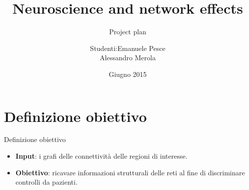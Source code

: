 \documentclass[10pt, compress]{beamer}
\begin{document}
	\title{Neuroscience and network effects}
	\subtitle{Project plan}
	\date{ \vspace{1cm} \hspace{0.1cm}  Giugno 2015}

	\author{\begin{tabular}{l@{ }l} 
			Studenti:      & Emanuele Pesce\\
			& Alessandro Merola \\[1ex]
		\end{tabular}}
		
		\begin{frame}
			\titlepage
		\end{frame}
		
%		
		
		\section{Definizione obiettivo}
			\begin{frame}{Definizione obiettivo}
				\begin{itemize}
					\item \textbf{Input}: i grafi delle connettività delle regioni di interesse.
					\item \textbf{Obiettivo}: ricavare informazioni strutturali delle reti al fine di discriminare controlli da pazienti.
				\end{itemize}
			\end{frame}
		
\end{document}
